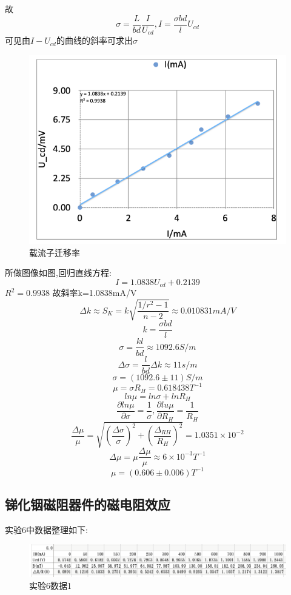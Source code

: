 \documentclass{thuemp}
\begin{document}
故
\[\sigma = \frac{L}{bd}\frac{I}{U_{cd}},I=\frac{\sigma bd}{l}U_{cd}\]
可见由$I-U_{cd}$的曲线的斜率可求出$\sigma$
\begin{figure}[H]
	\centering
	\includegraphics[width=0.8\linewidth]{./image/6.png}
	\caption{载流子迁移率} \label{fig:eg}
\end{figure}
所做图像如图,回归直线方程:$$I=1.0838U_{cd}+0.2139$$
$R^2=0.9938$
故斜率k=1.0838mA/V
\[\Delta k \approx S_{K}=k\sqrt{\frac{1/r^{2}-1}{n-2}}\approx0.010831mA/V\]
\[k=\frac{\sigma bd}{l}\]
\[\sigma=\frac{k l}{b d}\approx1092.6S/m\]
\[\Delta \sigma =\frac{l}{bd}\Delta k\approx11s/m\]
\[\sigma=(1092.6\pm11)S/m\]
\[\mu=\sigma R_{H}=0.618438T^{-1}\]
\[ln\mu=ln\sigma+lnR_{H}\]
\[\frac{\partial ln \mu}{\partial \sigma}=\frac{1}{\sigma},\frac{\partial lu \mu}{\partial R_{H}}=\frac{1}{R_{H}}\]
\[\frac{\Delta \mu}{\mu}=\sqrt{(\frac{\Delta \sigma}{\sigma})^{2}+(\frac{\Delta_{RH}}{R_{H}})^{2}}
=1.0351\times 10^{-2}\]
\[\Delta \mu =\mu \frac{\Delta \mu}{\mu}\approx 6\times 10^{-3}T^{-1}\]
\[\mu=(0.606\pm0.006)T^{-1}\]
\subsection{锑化铟磁阻器件的磁电阻效应}
实验6中数据整理如下:
\begin{figure}[H]
	\centering
	\includegraphics[width=0.8\linewidth]{./image/n3.png}
	\caption{实验6数据1} \label{fig:eg}
\end{figure}
\end{document}
